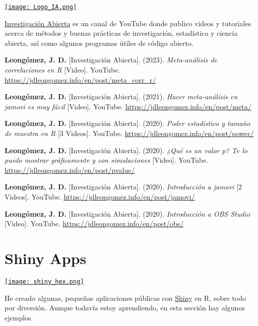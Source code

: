 \documentclass[11pt,a4paper,]{awesome-cv}
\begin{document}
\begin{minipage}[c]{0.15\linewidth}
\href{https://www.youtube.com/@InvestigacionAbierta}{\texttt{[image: Logo\_IA.png]}}
\end{minipage} \begin{minipage}[c]{0.85\linewidth}
\textcolor{red}{\faYoutube} \href{https://www.youtube.com/@InvestigacionAbierta}{Investigación Abierta} es un canal de YouTube donde publico videos y tutoriales acerca de métodos y buenas prácticas de investigación, estadística y ciencia abierta, así como algunos programas útiles de código abierto.
\end{minipage}

\begingroup
\footnotesize
\setlength{\parindent}{-0.5in}
\setlength{\leftskip}{0.5in}

\textbf{Leongómez, J. D.} {[}Investigación Abierta{]}. (2023).
\emph{Meta-análisis de correlaciones en R} {[}Video{]}. YouTube.
\url{https://jdleongomez.info/en/post/meta_corr_r/}

\textbf{Leongómez, J. D.} {[}Investigación Abierta{]}. (2021).
\emph{Hacer meta-análisis en jamovi es muy fácil} {[}Video{]}. YouTube.
\url{https://jdleongomez.info/en/post/meta/}

\textbf{Leongómez, J. D.} {[}Investigación Abierta{]}. (2020).
\emph{Poder estadístico y tamaño de muestra en R} {[}3 Videos{]}.
YouTube. \url{https://jdleongomez.info/en/post/power/}

\textbf{Leongómez, J. D.} {[}Investigación Abierta{]}. (2020).
\emph{¿Qué es un valor p? Te lo puedo mostrar gráficamente y con
simulaciones} {[}Video{]}. YouTube.
\url{https://jdleongomez.info/en/post/pvalue/}

\textbf{Leongómez, J. D.} {[}Investigación Abierta{]}. (2020).
\emph{Introducción a jamovi} {[}2 Videos{]}. YouTube.
\url{https://jdleongomez.info/en/post/jamovi/}

\textbf{Leongómez, J. D.} {[}Investigación Abierta{]}. (2020).
\emph{Introducción a OBS Studio} {[}Video{]}. YouTube.
\url{https://jdleongomez.info/en/post/obs/}

\endgroup

\hypertarget{shiny-apps}{%
\section{Shiny Apps}\label{shiny-apps}}

\begin{minipage}[c]{0.10\linewidth}
\href{https://jdleongomez.info/es/#shiny}{\texttt{[image: shiny\_hex.png]}}
\end{minipage} \begin{minipage}[c]{0.90\linewidth}
He creado algunas, pequeñas aplicaciones públicas con \href{https://shiny.posit.co/}{Shiny} en R, sobre todo por diversión. Aunque todavía estoy aprendiendo, en esta sección hay algunos ejemplos.
\end{minipage}
\end{document}
